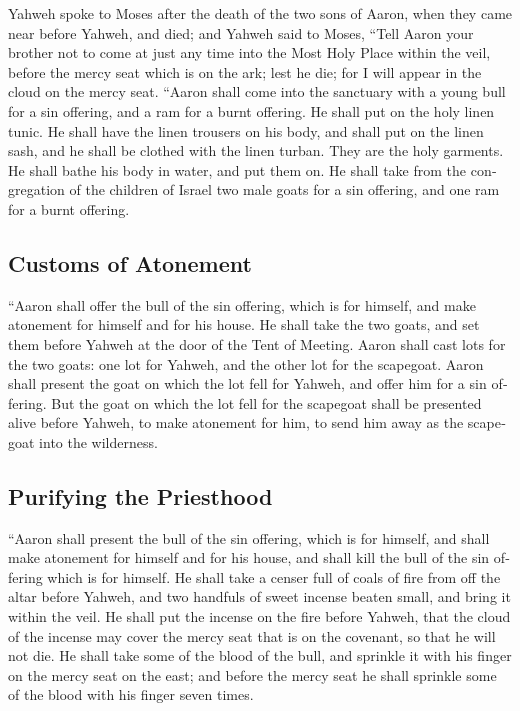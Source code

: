 \begin{paracol}{2}
\begin{otherlanguage}{english}
 Yahweh spoke to Moses after the death of the two sons of
Aaron, when they came near before Yahweh, and died;  and
Yahweh said to Moses, ``Tell Aaron your brother not to come at just any
time into the Most Holy Place within the veil, before the mercy seat
which is on the ark; lest he die; for I will appear in the cloud on the
mercy seat.  ``Aaron shall come into the sanctuary with a
young bull for a sin offering, and a ram for a burnt offering.
 He shall put on the holy linen tunic. He shall have the
linen trousers on his body, and shall put on the linen sash, and he
shall be clothed with the linen turban. They are the holy garments. He
shall bathe his body in water, and put them on.  He shall
take from the congregation of the children of Israel two male goats for
a sin offering, and one ram for a burnt offering.

\hypertarget{customs-of-atonement}{%
\subsection{Customs of Atonement}\label{customs-of-atonement}}

 ``Aaron shall offer the bull of the sin offering, which
is for himself, and make atonement for himself and for his house.
 He shall take the two goats, and set them before Yahweh
at the door of the Tent of Meeting.  Aaron shall cast lots
for the two goats: one lot for Yahweh, and the other lot for the
scapegoat.  Aaron shall present the goat on which the lot
fell for Yahweh, and offer him for a sin offering.  But
the goat on which the lot fell for the scapegoat shall be presented
alive before Yahweh, to make atonement for him, to send him away as the
scapegoat into the wilderness.

\hypertarget{purifying-the-priesthood}{%
\subsection{Purifying the Priesthood}\label{purifying-the-priesthood}}

 ``Aaron shall present the bull of the sin offering,
which is for himself, and shall make atonement for himself and for his
house, and shall kill the bull of the sin offering which is for himself.
 He shall take a censer full of coals of fire from off
the altar before Yahweh, and two handfuls of sweet incense beaten small,
and bring it within the veil.  He shall put the incense
on the fire before Yahweh, that the cloud of the incense may cover the
mercy seat that is on the covenant, so that he will not die.
 He shall take some of the blood of the bull, and
sprinkle it with his finger on the mercy seat on the east; and before
the mercy seat he shall sprinkle some of the blood with his finger seven
times.


\end{otherlanguage}
\end{paracol}
